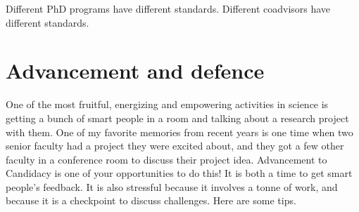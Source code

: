 \documentclass[letterpaper,10pt,english]{sphinxmanual}
\begin{document}
\sphinxAtStartPar
Different PhD programs have different standards.
Different co\sphinxhyphen{}advisors have different standards.


\section{Advancement and defence}
\label{\detokenize{04WhatIsAPhD:advancement-and-defence}}
\sphinxAtStartPar
One of the most fruitful, energizing and empowering activities in science is getting a bunch of smart people in a room and talking about a research project with them.
One of my favorite memories from recent years is one time when two senior faculty had a project they were excited about, and they got a few other faculty in a conference room to discuss their project idea.
Advancement to Candidacy is one of your opportunities to do this! It is both a time to get smart people’s feedback. It is also stressful because it involves a tonne of work, and because it is a checkpoint to discuss challenges. Here are some tips.
\end{document}
